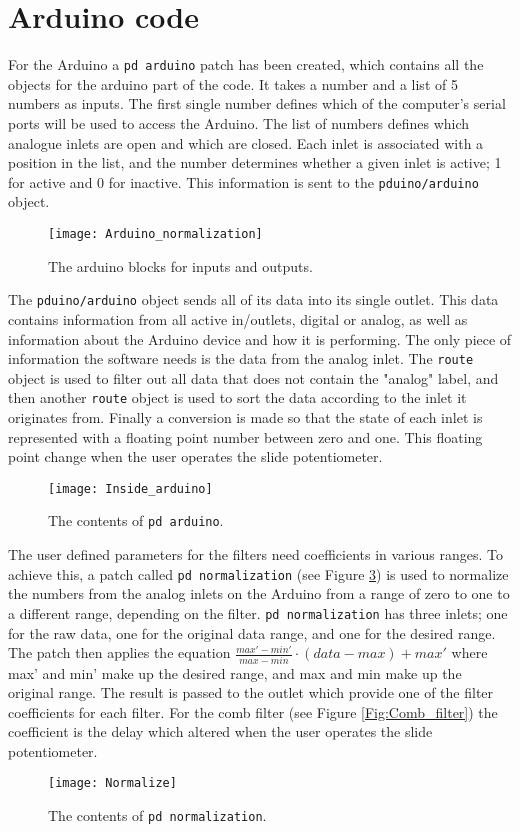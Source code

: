 \section{Arduino code}
For the Arduino a \texttt{pd arduino} patch has been created, which contains all the objects for the arduino part of the code. It takes a number and a list of 5 numbers as inputs. The first single number defines which of the computer's serial ports will be used to access the Arduino. The list of numbers defines which analogue inlets are open and which are closed. Each inlet is associated with a position in the list, and the number determines whether a given inlet is active; 1 for active and 0 for inactive. This information is sent to the \texttt{pduino/arduino} object.

\begin{figure}
\centering
\texttt{[image: Arduino\_normalization]}
\caption{The arduino blocks for inputs and outputs.}
\label{Fig:Arudino_normalization}
\end{figure}

The \texttt{pduino/arduino} object sends all of its data into its single outlet. This data contains information from all active in/outlets, digital or analog, as well as information about the Arduino device and how it is performing. The only piece of information the software needs is the data from the analog inlet. The \texttt{route} object is used to filter out all data that does not contain the "analog" label, and then another \texttt{route} object is used to sort the data according to the inlet it originates from. Finally a conversion is made so that the state of each inlet is represented with a floating point number between zero and one. This floating point change when the user operates the slide potentiometer.


\begin{figure}
\centering
\texttt{[image: Inside\_arduino]}
\caption{The contents of \texttt{pd arduino}.}
\label{Fig:Inside_arduino}
\end{figure}

The user defined parameters for the filters need coefficients in various ranges. To achieve this, a patch called \texttt{pd normalization} (see Figure \ref{Fig:Normalize}) is used to normalize the numbers from the analog inlets on the Arduino from a range of zero to one to a different range, depending on the filter. \texttt{pd normalization} has three inlets; one for the raw data, one for the original data range, and one for the desired range. The patch then applies the equation $\frac{max'-min'}{max-min}\cdot (data-max)+max'$ where max' and min' make up the desired range, and max and min make up the original range. The result is passed to the outlet which provide one of the filter coefficients for each filter. For the comb filter (see Figure \ref{Fig:Comb_filter}) the coefficient is the delay which altered when the user operates the slide potentiometer. 

\begin{figure}
\centering
\texttt{[image: Normalize]}
\caption{The contents of \texttt{pd normalization}.}
\label{Fig:Normalize}
\end{figure}